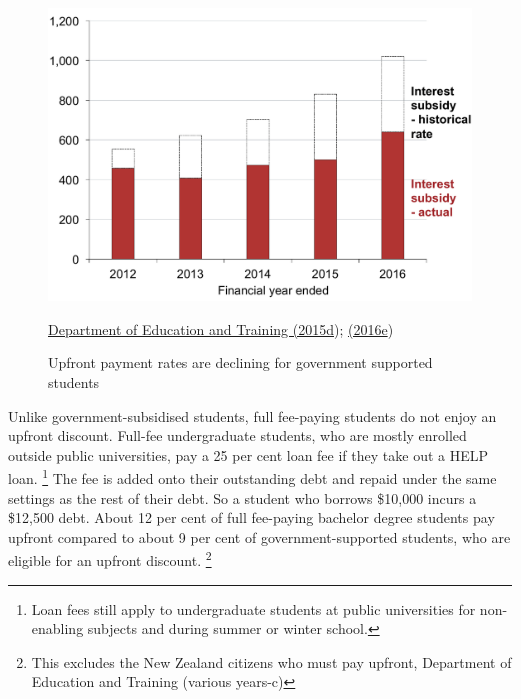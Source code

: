 \documentclass[embargoed]{grattan}
\begin{document}
\begin{figure}
\caption{Upfront payment rates are declining for government supported students}\label{fig:fig6-upfront-payment-rates-are-declining-for-govt-supported-students}

\includegraphics[page=6]{atlas/Chartpack.pdf}

{\protect\hyperlink{_ENREF_27}{Department of Education and Training (2015d}); \protect\hyperlink{_ENREF_33}{(2016e})}
\end{figure}

Unlike government-subsidised students, full fee-paying students do not enjoy an upfront discount.
Full-fee undergraduate students, who are mostly enrolled outside public universities, pay a 25 per cent loan fee if they take out a HELP loan. \footnote{Loan fees still apply to undergraduate students at public universities for non-enabling subjects and during summer or winter school.} The fee is added onto their outstanding debt and repaid under the same settings as the rest of their debt.
So a student who borrows \$10,000 incurs a \$12,500 debt.
About 12 per cent of full fee-paying bachelor degree students pay upfront compared to about 9 per cent of government-supported students, who are eligible for an upfront discount.%
\footnote{This excludes the New Zealand citizens who must pay upfront, Department of Education and Training (various years-c)}
\end{document}
